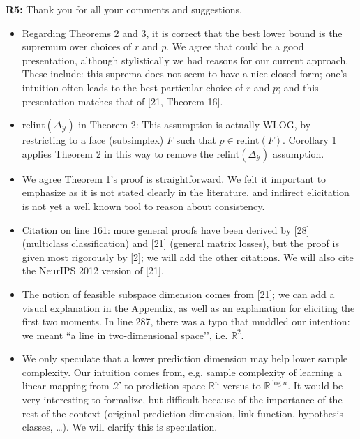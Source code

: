 \documentclass{article}
\newcommand{\reals}{\mathbb{R}}
\newcommand{\X}{\mathcal{X}}
\newcommand{\Y}{\mathcal{Y}}
\begin{document}
\textbf{R5:} Thank you for all your comments and suggestions.
\begin{itemize}[itemsep=1pt,topsep=0pt]
\item 
Regarding Theorems 2 and 3, it is correct that the best lower bound is the supremum over choices of $r$ and $p$. We agree that could be a good presentation, although stylistically we had reasons for our current approach. These include: this suprema does not seem to have a nice closed form; one’s intuition often leads to the best particular choice of $r$ and $p$; and this presentation matches that of [21, Theorem 16].

\item 
$\mathrm{relint}(\Delta_\Y)$ in Theorem 2: This assumption is actually WLOG, by restricting to a face (subsimplex) $F$ such that $p\in\mathrm{relint}(F)$. Corollary 1 applies Theorem 2 in this way to remove the $\mathrm{relint}(\Delta_\Y)$ assumption.

\item 
  We agree Theorem 1's proof is straightforward. We felt it important to emphasize as it is not stated clearly in the literature, and indirect elicitation is not yet a well known tool to reason about consistency.

\item 
Citation on line 161: more general proofs have been derived by [28] (multiclass classification) and [21] (general matrix losses), but the proof is given most rigorously by [2]; we will add the other citations. We will also cite the NeurIPS 2012 version of [21].

\item 
The notion of feasible subspace dimension comes from [21]; we can add a visual explanation in the Appendix, as well as an explanation for eliciting the first two moments.  In line 287, there was a typo that muddled our intention: we meant ``a line in two-dimensional space’’, i.e. $\reals^2$.

\item 
We only speculate that a lower prediction dimension may help lower sample complexity. Our intuition comes from, e.g. sample complexity of learning a linear mapping from $\X$ to prediction space $\reals^n$ versus to $\reals^{\log n}$. It would be very interesting to formalize, but difficult because of the importance of the rest of the context (original prediction dimension, link function, hypothesis classes, …). We will clarify this is speculation.
\end{itemize}
\end{document}
